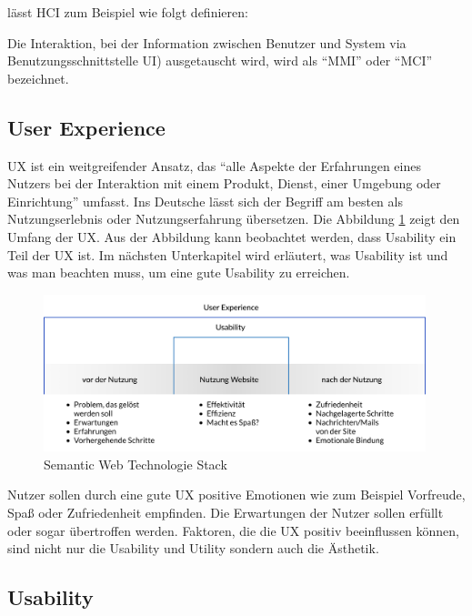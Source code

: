 \noindent \citet{heimgartner_interkulturelles_2017} lässt \ac{HCI} zum Beispiel wie folgt definieren:

\begin{definition}
  Die Interaktion, bei der Information zwischen Benutzer und System via Benutzungsschnittstelle \ac{UI}) ausgetauscht wird, wird als \enquote{\ac{MMI}}  oder  \enquote{\ac{MCI}} 		 bezeichnet.
\end{definition}

\subsection{User Experience}

 \ac{UX} ist ein weitgreifender Ansatz, das \enquote{alle Aspekte der Erfahrungen eines Nutzers bei der Interaktion mit einem Produkt, Dienst, einer Umgebung oder Einrichtung} umfasst.
Ins Deutsche lässt sich der Begriff am besten als Nutzungserlebnis oder Nutzungserfahrung übersetzen. \citep[vgl.]{jacobsen_praxisbuch_2019}
Die Abbildung \ref{fig:abb2} zeigt den Umfang der \ac{UX}.
Aus der Abbildung kann beobachtet werden, dass Usability ein Teil der \ac{UX} ist.
Im nächsten Unterkapitel wird erläutert, was Usability ist und was man beachten muss, um eine gute Usability zu erreichen.

\begin{figure}[h]
	\centering
    	\includegraphics[width=0.99\textwidth]{Images/User_Experience.png}
   	\caption{Semantic Web Technologie Stack}
   	\label{fig:abb2}
\end{figure}

Nutzer sollen durch eine gute \ac{UX} positive Emotionen wie zum Beispiel Vorfreude, Spaß oder Zufriedenheit empfinden.
Die Erwartungen der Nutzer sollen erfüllt oder sogar übertroffen werden.
Faktoren, die die \ac{UX} positiv beeinflussen können, sind nicht nur die Usability und Utility sondern auch die Ästhetik. \citep[vgl.]{weichert_quick_2021}

\subsection{Usability}

